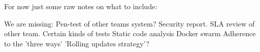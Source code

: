 \documentclass[a4paper, 11pt, titlepage]{article}
\begin{document}

\newpage





\newpage

\newpage

For now just some raw notes on what to include:

We are missing:
Pen-test of other teams system?
Security report.
SLA review of other team.
Certain kinds of tests
Static code analysis
Docker swarm
Adherence to the 'three ways'
'Rolling updates strategy'?

\newpage
\printbibliography
\end{document}

